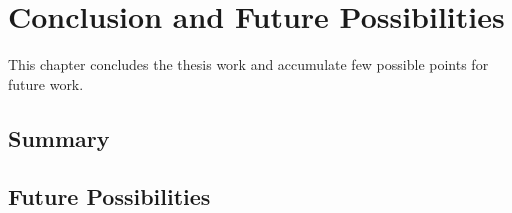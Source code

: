 
\chapter{Conclusion and Future Possibilities} %

This chapter concludes the thesis work and accumulate few possible points for future work.

\label{Chapter8} %

\section{Summary}\label{section:ConclusionSummary}





















\section{Future Possibilities}\label{section:FuturePossibilities}